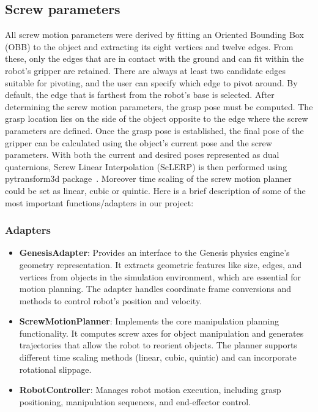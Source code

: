 \documentclass{article}
\begin{document}
\subsection{Screw parameters}
All screw motion parameters were derived by fitting an Oriented Bounding Box (OBB) to the object and extracting its eight vertices and twelve edges. From these, only the edges that are in contact with the ground and can fit within the robot’s gripper are retained. There are always at least two candidate edges suitable for pivoting, and the user can specify which edge to pivot around. By default, the edge that is farthest from the robot’s base is selected.
After determining the screw motion parameters, the grasp pose must be computed. The grasp location lies on the side of the object opposite to the edge where the screw parameters are defined. Once the grasp pose is established, the final pose of the gripper can be calculated using the object's current pose and the screw parameters. With both the current and desired poses represented as dual quaternions, Screw Linear Interpolation (ScLERP) is then performed using pytransform3d package~\cite{Fabisch2019}. Moreover time scaling of the screw motion planner could be set as linear, cubic or quintic.
Here is a brief description of some of the most important functions/adapters in our project:
\subsubsection*{Adapters}
\begin{itemize}
    \item \textbf{GenesisAdapter}: Provides an interface to the Genesis physics engine's geometry representation. It extracts geometric features like size, edges, and vertices from objects in the simulation environment, which are essential for motion planning. The adapter handles coordinate frame conversions and methods to control robot's position and velocity.
    \item \textbf{ScrewMotionPlanner}: Implements the core manipulation planning functionality. It computes screw axes for object manipulation and generates trajectories that allow the robot to reorient objects. The planner supports different time scaling methods (linear, cubic, quintic) and can incorporate rotational slippage.
    \item \textbf{RobotController}: Manages robot motion execution, including grasp positioning, manipulation sequences, and end-effector control. 
\end{itemize}
\end{document}
